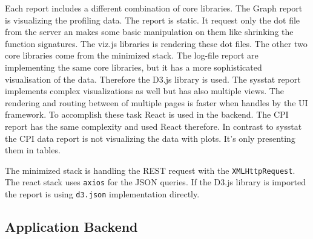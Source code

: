 \documentclass[american,a4paper,oneside,,tablecaptionabove]{scrbook}
\begin{document}
Each report includes a different combination of core libraries. The
Graph report is visualizing the profiling data. The report is static. It
request only the dot file from the server an makes some basic
manipulation on them like shrinking the function signatures. The viz.js
libraries is rendering these dot files. The other two core libraries
come from the minimized stack. The log-file report are implementing the
same core libraries, but it has a more sophisticated visualisation of
the data. Therefore the D3.js library is used. The sysstat report
implements complex visualizations as well but has also multiple views.
The rendering and routing between of multiple pages is faster when
handles by the UI framework. To accomplish these task React is used in
the backend. The CPI report has the same complexity and used React
therefore. In contrast to sysstat the CPI data report is not visualizing
the data with plots. It's only presenting them in tables.

The minimized stack is handling the REST request with the
\lstinline!XMLHttpRequest!. The react stack uses \lstinline!axios! for
the JSON queries. If the D3.js library is imported the report is using
\lstinline!d3.json! implementation directly.

\subsection{Application Backend}\label{application-backend}
\end{document}
